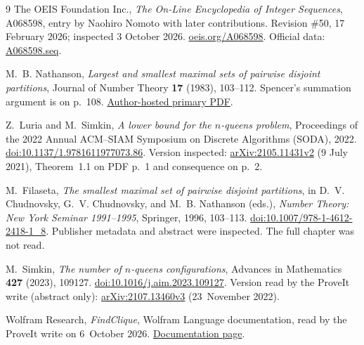 \documentclass[11pt,letterpaper]{article}
\numberwithin{equation}{section}
\theoremstyle{remark}\newtheorem{remark}[theorem]{Remark}
\begin{document}
\begin{thebibliography}{9}
The OEIS Foundation Inc., \emph{The On-Line Encyclopedia of Integer
Sequences}, A068598, entry by Naohiro Nomoto with later contributions.
Revision \#50, 17 February 2026; inspected 3 October 2026.
\href{https://oeis.org/A068598}{oeis.org/A068598}.
Official data: \href{https://github.com/oeis/oeisdata/blob/main/seq/A068/A068598.seq}{A068598.seq}.

M.~B. Nathanson, \emph{Largest and smallest maximal sets of pairwise
disjoint partitions}, Journal of Number Theory \textbf{17} (1983),
103--112. Spencer's summation argument is on p.~108.
\href{https://www.theoryofnumbers.com/melnathanson/pdfs/nath1983-49.pdf}{Author-hosted primary PDF}.

Z.~Luria and M.~Simkin, \emph{A lower bound for the $n$-queens problem},
Proceedings of the 2022 Annual ACM--SIAM Symposium on Discrete
Algorithms (SODA), 2022.
\href{https://doi.org/10.1137/1.9781611977073.86}{doi:10.1137/1.9781611977073.86}.
Version inspected: \href{https://arxiv.org/abs/2105.11431v2}{arXiv:2105.11431v2}
(9 July 2021), Theorem~1.1 on PDF p.~1 and consequence on p.~2.

M.~Filaseta, \emph{The smallest maximal set of pairwise disjoint
partitions}, in D.~V. Chudnovsky, G.~V. Chudnovsky, and M.~B. Nathanson
(eds.), \emph{Number Theory: New York Seminar 1991--1995}, Springer,
1996, 103--113.
\href{https://doi.org/10.1007/978-1-4612-2418-1_8}{doi:10.1007/978-1-4612-2418-1\_8}.
Publisher metadata and abstract were inspected. The full chapter
was not read.

M.~Simkin, \emph{The number of $n$-queens configurations}, Advances in
Mathematics \textbf{427} (2023), 109127.
\href{https://doi.org/10.1016/j.aim.2023.109127}{doi:10.1016/j.aim.2023.109127}.
Version read by the ProveIt write (abstract only):
\href{https://arxiv.org/abs/2107.13460v3}{arXiv:2107.13460v3} (23~November 2022).

Wolfram Research, \emph{FindClique}, Wolfram Language documentation, read
by the ProveIt write on 6~October 2026.
\href{https://reference.wolfram.com/language/ref/FindClique.html}{Documentation page}.
\end{thebibliography}
\end{document}
